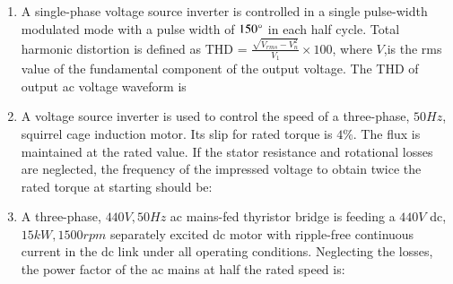 \documentclass[journal]{IEEEtran}
\begin{document}
\begin{enumerate}
\item A single-phase voltage source inverter is controlled in a single pulse-width modulated mode with a pulse width of $150\degree$ in each half cycle. Total harmonic distortion is defined as THD = $\frac{\sqrt{V_{rms}-V_n^2}}{V_1} \times 100$, where $V$,is the rms value of the fundamental component of the output voltage. The THD of output ac voltage waveform is
	\begin{enumerate}
\end{enumerate}
\item A voltage source inverter is used to control the speed of a three-phase, $50 Hz$, squirrel cage induction motor. Its slip for rated torque is $4\%$. The flux is maintained at the rated value. If the stator resistance and rotational losses are neglected, the frequency of the impressed voltage to obtain twice the rated torque at starting should be:
\begin{enumerate}
\end{enumerate}
\item A three-phase, $440 V, 50 Hz$ ac mains-fed thyristor bridge is feeding a $440 V$ dc, $15 kW, 1500 rpm$ separately excited dc motor with ripple-free continuous current in the dc link under all operating conditions. Neglecting the losses, the power factor of the ac mains at half the rated speed is:
\begin{enumerate}
\end{enumerate}
\end{enumerate}
\end{document}

